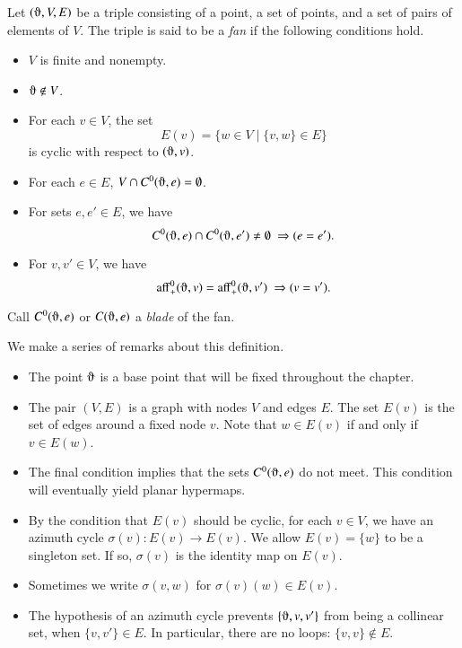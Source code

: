 \begin{definition}[fan]  Let $(\orgn,V,E)$ be a triple consisting of a point,
a set of
points, and a set of pairs of elements of $V$.  The triple is said to be
a {\it fan\/} if the following conditions hold.
    \begin{itemize}
    \item $V$ is finite and nonempty.
    \item $\orgn\not\in V$.
    \item For each $v\in V$, the set
        $$
        E(v) = \{w\in V\mid \{v,w\}\in E\}
        $$
        is cyclic with respect to $(\orgn,v)$.
    \item For each $e\in E$, $V\cap C^0(\orgn,e)=\emptyset$.
    \item For sets $e,e'\in E$,   we have
        $$C^0(\orgn,e) \cap C^0(\orgn,e')\ne\emptyset\ \Rightarrow (e = e').$$
    \item For $v,v'\in V$, we have
      $$\op{aff}^0_+(\orgn,v) = \op{aff}^0_+(\orgn,v')\ \Rightarrow (v=v').$$
    \end{itemize}
Call $C^0(\orgn,e)$ or $C(\orgn,e)$ a {\it blade\/} of the fan.
\end{definition}

We make a series of remarks about this definition.

\begin{remark}
\begin{itemize}
\item The point $\orgn$ is a base point that will be fixed throughout
the chapter.  
\item The pair $(V,E)$ is a graph with nodes $V$ and edges $E$.  The set
$E(v)$ is the set of edges around a fixed node $v$.
Note that $w\in E(v)$ if and only if $v\in E(w)$.   
%
\item The final condition implies that the sets $C^0(\orgn,e)$
do not meet.   This condition will eventually yield planar
hypermaps.
%
\item
By the condition that $E(v)$ should be cyclic,
for each $v\in V$, we have an azimuth cycle $\sigma(v):E(v)\to E(v)$.
We allow $E(v) = \{w\}$ to be a
singleton set. If so,
$\sigma(v)$ is the identity map on $E(v)$.
%
\item
Sometimes we write $\sigma(v,w)$ for $\sigma(v)(w)\in E(v)$.
%
\item 
The hypothesis of an azimuth cycle
prevents $\{\orgn,v,v'\}$ from being a collinear set, when $\{v,v'\}\in
E$.  In particular, there are no loops: $\{v,v\}\not\in E$.
%
\end{itemize}
\end{remark}





